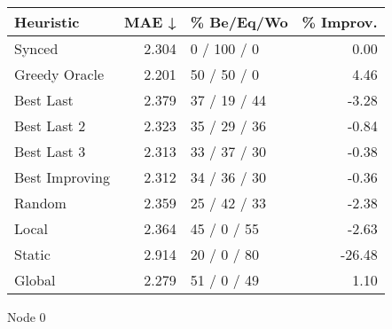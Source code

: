 \begin{tabular}{lrlr}
\toprule
\textbf{Heuristic} & \textbf{MAE ↓} & \textbf{\% Be/Eq/Wo} & \textbf{\% Improv.} \\
\midrule
            Synced &          2.304 &          0 / 100 / 0 &                0.00 \\
     Greedy Oracle &          2.201 &          50 / 50 / 0 &                4.46 \\
         Best Last &          2.379 &         37 / 19 / 44 &               -3.28 \\
       Best Last 2 &          2.323 &         35 / 29 / 36 &               -0.84 \\
       Best Last 3 &          2.313 &         33 / 37 / 30 &               -0.38 \\
    Best Improving &          2.312 &         34 / 36 / 30 &               -0.36 \\
            Random &          2.359 &         25 / 42 / 33 &               -2.38 \\
             Local &          2.364 &          45 / 0 / 55 &               -2.63 \\
            Static &          2.914 &          20 / 0 / 80 &              -26.48 \\
            Global &          2.279 &          51 / 0 / 49 &                1.10 \\
\bottomrule
\end{tabular}
\caption{Node 0}
\label{tab:hr_iid_lr05_le2_bs2_0}
